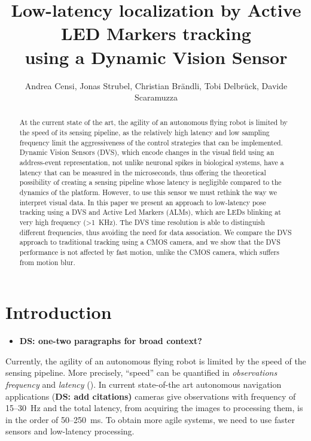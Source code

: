 
\title{\Large Low-latency localization by Active LED Markers tracking \\
using a Dynamic Vision Sensor}


\author{Andrea Censi\mythanks, Jonas Strubel, Christian Br\"andli, Tobi
Delbr\"uck, Davide Scaramuzza}
\maketitle
\begin{abstract}
At the current state of the art, the agility of an autonomous flying
robot is limited by the speed of its sensing pipeline, as the relatively
high latency and low sampling frequency limit the aggressiveness of
the control strategies that can be implemented. Dynamic Vision Sensors
(DVS), which encode changes in the visual field using an address-event
representation, not unlike neuronal spikes in biological systems,
have a latency that can be measured in the microseconds, thus offering
the theoretical possibility of creating a sensing pipeline whose latency
is negligible compared to the dynamics of the platform. However, to
use this sensor we must rethink the way we interpret visual data.
In this paper we present an approach to low-latency pose tracking
using a DVS and Active Led Markers (ALMs), which are LEDs blinking
at very high frequency (>1~KHz). The DVS time resolution is able
to distinguish different frequencies, thus avoiding the need for data
association. We compare the DVS approach to traditional tracking using
a CMOS camera, and we show that the DVS performance is not affected
by fast motion, unlike the CMOS camera, which suffers from motion
blur. 
\end{abstract}

\section{Introduction}
\begin{itemize}
\item \textbf{DS: one-two paragraphs for broad context?}
\end{itemize}
\lorem

\lorem

Currently, the agility of an autonomous flying robot is limited by
the speed of the sensing pipeline. More precisely, ``speed'' can
be quantified in \emph{observations frequency} and \emph{latency}
(). In current state-of-the
art autonomous navigation applications (\textbf{DS: add citations)
}cameras give observations with frequency of 15--30~Hz and the total
latency, from acquiring the images to processing them, is in the order
of 50--250~ms. To obtain more agile systems, we need to use faster
sensors and low-latency processing.

